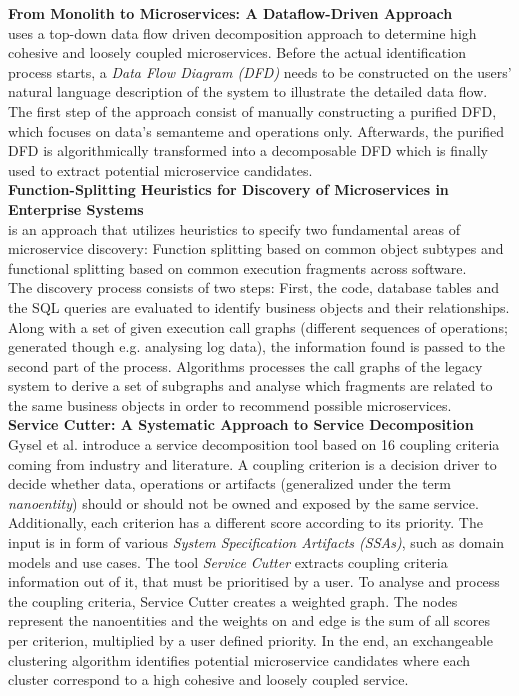 \noindent
\textbf{From Monolith to Microservices: A Dataflow-Driven Approach } \\
\cite{DataflowDrivenChen} uses a top-down data flow driven decomposition approach to determine high cohesive and loosely coupled microservices. Before the actual identification process starts, a \textit{Data Flow Diagram (DFD)} needs to be constructed on the users' natural language description of the system to illustrate the detailed data flow. The first step of the approach consist of manually constructing a purified DFD, which focuses on data's semanteme and operations only. Afterwards, the purified DFD is algorithmically transformed into a decomposable DFD which is finally used to extract potential microservice candidates. \\


\noindent
\textbf{Function-Splitting Heuristics for Discovery of Microservices in Enterprise Systems  } \\
\cite{HeuristicsAlwis} is an approach that utilizes heuristics to specify two fundamental areas of microservice discovery: Function splitting based on common object subtypes and functional splitting based on common execution fragments across software. \\
The discovery process consists of two steps: First, the code, database tables and the SQL queries are evaluated to identify business objects and their relationships. Along with a set of given execution call graphs (different sequences of operations; generated though e.g. analysing log data), the information found is passed to the second part of the process. Algorithms processes the call graphs of the legacy system to derive a set of subgraphs and analyse which fragments are related to the same business objects in order to recommend possible microservices. \\

\noindent
\textbf{Service Cutter: A Systematic Approach to Service Decomposition  } \\
Gysel et al. \cite{ServiceCutter} introduce a service decomposition tool based on 16 coupling criteria coming from industry and literature. A coupling criterion is a decision driver to decide whether data, operations or artifacts (generalized under the term \textit{nanoentity}) should or should not be owned and exposed by the same service. Additionally, each criterion has a different score according to its priority.
The input is in form of various \textit{System Specification Artifacts (SSAs)}, such as domain models and use cases.  The tool \textit{Service Cutter} extracts coupling criteria information out of it, that must be prioritised by a user. To analyse and process the coupling criteria, Service Cutter creates a weighted graph. The nodes represent the nanoentities and the weights on and edge is the sum of all scores per criterion, multiplied by a user defined priority. In the end, an exchangeable clustering algorithm identifies potential microservice candidates where each cluster correspond to a high cohesive and loosely coupled service.
 
 





















